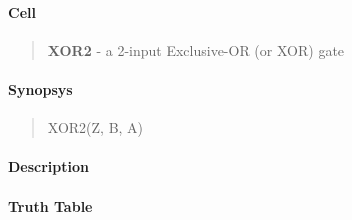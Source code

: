\label{XOR2}
\paragraph{Cell}
\begin{quote}
    \textbf{XOR2} - a 2-input Exclusive-OR (or XOR) gate
\end{quote}

\paragraph{Synopsys}
\begin{quote}
    XOR2(Z, B, A)
\end{quote}

\paragraph{Description}



\paragraph{Truth Table}


